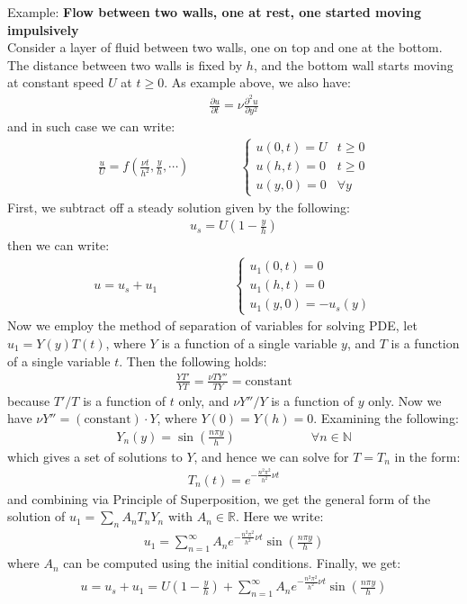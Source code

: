 \documentclass[11pt]{book}
\theoremstyle{break}
\theoremstyle{break}
\newcommand{\R}{\mathbb{R}}
\newcommand{\N}{\mathbb{N}}
\newcommand{\example}{\color{green}Example: \color{black}}
\begin{document}
\newpage
\example 
\textbf{Flow between two walls, one at rest, one started moving impulsively}\\
Consider a layer of fluid between two walls, one on top and one at the bottom. The distance between two walls is fixed by $h$, and the bottom wall starts moving at constant speed $U$ at $t\geq 0$. As example above, we also have:
\begin{align*}
\frac{\partial u}{\partial t} = \nu \frac{\partial^2 u}{\partial y^2}
\end{align*}
and in such case we can write:
\begin{align*}
\frac{u}{U} = f\left(\frac{\nu t}{h^2}, \frac{y}{h}, \cdots \right) \qquad \qquad \begin{cases}
u(0,t) = U & t\geq 0 \\
u(h,t) = 0 & t\geq 0 \\
u(y,0) = 0 & \forall y
\end{cases}
\end{align*}
First, we subtract off a steady solution given by the following:
\begin{align*}
u_s = U\left( 1 - \frac{y}{h}\right)
\end{align*}
then we can write:
\begin{align*} 
u = u_s+u_1 \qquad\qquad\qquad
\begin{cases}
u_1(0,t) = 0 \\ 
u_1(h,t) = 0\\
u_1(y,0) = -u_s(y)
\end{cases}
\end{align*}
Now we employ the method of separation of variables for solving PDE, let $u_1 = Y(y) T(t)$, where $Y$ is a function of a single variable $y$, and $T$ is a function of a single variable $t$. Then the following holds:
\begin{align*}
\frac{YT'}{YT} = \frac{\nu TY''}{TY} = \text{constant}
\end{align*}
because $T'/T$ is a function of $t$ only, and $\nu Y''/Y$ is a function of $y$ only. Now we have $\nu Y '' = (\text{constant})\cdot Y$, where $Y(0) = Y(h) = 0$. Examining the following:
\begin{align*}
Y_n(y) = \sin\left( \frac{n\pi y}{h}\right) \qquad\qquad\qquad\forall n \in \N
\end{align*}
which gives a set of solutions to $Y$, and hence we can solve for $T = T_n$ in the form:
\begin{align*}
T_n(t) = e^{-\frac{n^2 \pi^2}{h^2}\nu t}
\end{align*}
and combining via Principle of Superposition, we get the general form of the solution of $u_1=\sum_n A_n T_n Y_n$ with $A_n \in \R$. Here we write:
\begin{align*}
u_1 = \sum_{n=1}^\infty A_n e^{-\frac{n^2 \pi^2}{h^2}\nu t} \sin\left( \frac{n \pi y}{h}\right)
\end{align*}
where $A_n$ can be computed using the initial conditions. Finally, we get:
\begin{align*}
u = u_s + u_1 =U\left(1-\frac{y}{h}\right)+ \sum_{n=1}^\infty A_n e^{-\frac{n^2 \pi^2}{h^2}\nu t} \sin\left( \frac{n \pi y}{h}\right) 
\end{align*}
\end{document}
